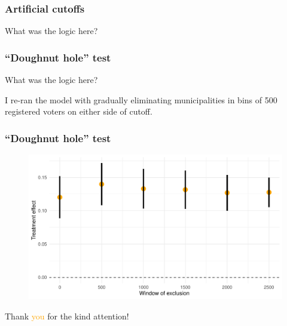 \documentclass[12pt,english,dvipsnames,aspectratio=169,handout]{beamer}\usepackage[]{graphicx}\usepackage[]{xcolor}
\begin{document}
\begin{frame}[fragile]
\frametitle{Artificial cutoffs}
What was the logic here?\bigskip
\pause



\begin{figure}
\centering
{}
\end{figure}

\end{frame}


\begin{frame}
\frametitle{``Doughnut hole'' test}
What was the logic here?\bigskip
\pause

I re-ran the model with gradually eliminating municipalities in bins of 500 registered voters on either side of cutoff.



\end{frame}

\begin{frame}
\frametitle{``Doughnut hole'' test}

\begin{figure}
\centering
\includegraphics[scale=0.6]{../04-figures/07/25.pdf}
\end{figure}

\end{frame}


\begin{frame}
\begin{center}
    \Huge Thank \textcolor{orange}{you} for the kind attention!
\end{center}
\end{frame}


\begin{frame}[allowframebreaks]

\scriptsize
\end{frame}
\end{document}
